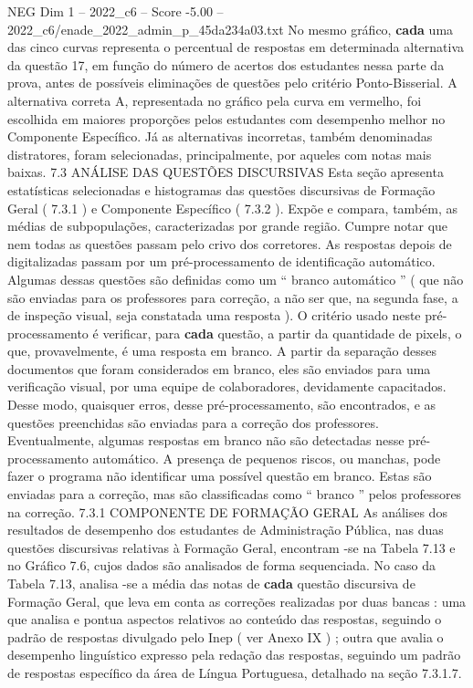 \begin{textsample}{NEG Dim 1 – 2022\_c6 – Score -5.00 – 2022\_c6/enade\_2022\_admin\_p\_45da234a03.txt}
No mesmo gráfico, \textbf{cada} uma das cinco curvas representa o percentual de respostas em determinada alternativa da questão 17, em função do número de acertos dos estudantes nessa parte da prova, antes de possíveis eliminações de questões pelo critério Ponto-Bisserial.
A alternativa correta A, representada no gráfico pela curva em vermelho, foi escolhida em maiores proporções pelos estudantes com desempenho melhor no Componente Específico.
Já as alternativas incorretas, também denominadas distratores, foram selecionadas, principalmente, por aqueles com notas mais baixas. 7.3 ANÁLISE DAS QUESTÕES DISCURSIVAS Esta seção apresenta estatísticas selecionadas e histogramas das questões discursivas de Formação Geral ( 7.3.1 ) e Componente Específico ( 7.3.2 ).
Expõe e compara, também, as médias de subpopulações, caracterizadas por grande região.
Cumpre notar que nem todas as questões passam pelo crivo dos corretores.
As respostas depois de digitalizadas passam por um pré-processamento de identificação automático.
Algumas dessas questões são definidas como um “ branco automático ” ( que não são enviadas para os professores para correção, a não ser que, na segunda fase, a de inspeção visual, seja constatada uma resposta ).
O critério usado neste pré-processamento é verificar, para \textbf{cada} questão, a partir da quantidade de pixels, o que, provavelmente, é uma resposta em branco.
A partir da separação desses documentos que foram considerados em branco, eles são enviados para uma verificação visual, por uma equipe de colaboradores, devidamente capacitados.
Desse modo, quaisquer erros, desse pré-processamento, são encontrados, e as questões preenchidas são enviadas para a correção dos professores.
Eventualmente, algumas respostas em branco não são detectadas nesse pré-processamento automático.
A presença de pequenos riscos, ou manchas, pode fazer o programa não identificar uma possível questão em branco.
Estas são enviadas para a correção, mas são classificadas como “ branco ” pelos professores na correção. 7.3.1 COMPONENTE DE FORMAÇÃO GERAL As análises dos resultados de desempenho dos estudantes de Administração Pública, nas duas questões discursivas relativas à Formação Geral, encontram -se na Tabela 7.13 e no Gráfico 7.6, cujos dados são analisados de forma sequenciada.
No caso da Tabela 7.13, analisa -se a média das notas de \textbf{cada} questão discursiva de Formação Geral, que leva em conta as correções realizadas por duas bancas : uma que analisa e pontua aspectos relativos ao conteúdo das respostas, seguindo o padrão de respostas divulgado pelo Inep ( ver Anexo IX ) ; outra que avalia o desempenho linguístico expresso pela redação das respostas, seguindo um padrão de respostas específico da área de Língua Portuguesa, detalhado na seção 7.3.1.7.

\end{textsample}
